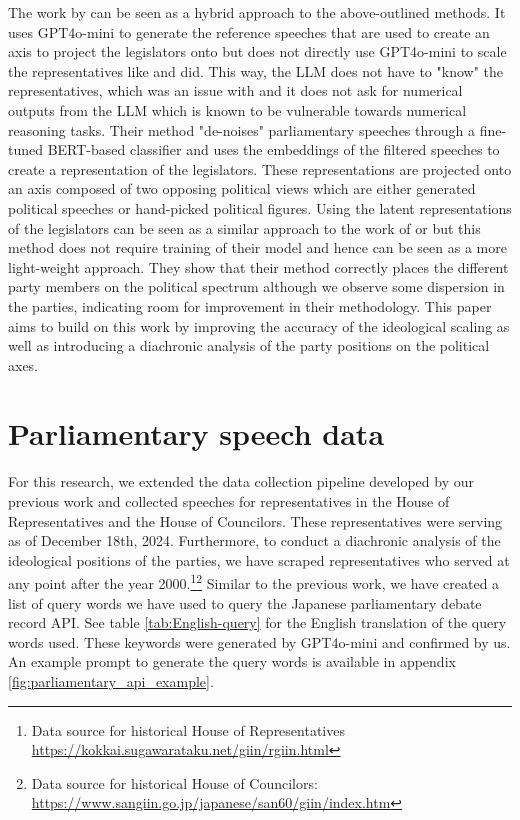 \documentclass[final,5p,times,twocolumn,authoryear]{elsarticle}
\begin{document}
The work by \citeauthor{kato2024lupinllmbasedpoliticalideology} can be seen as a hybrid approach to the above-outlined methods. It uses GPT4o-mini to generate the reference speeches that are used to create an axis to project the legislators onto but does not directly use GPT4o-mini to scale the representatives like \citeauthor{Scaling-Political-Texts-with-ChatGPT} and \citeauthor{llm-latent-position-of-politicians} did. This way, the LLM does not have to "know" the representatives, which was an issue with \citeauthor{llm-latent-position-of-politicians} and it does not ask for numerical outputs from the LLM which is known to be vulnerable towards numerical reasoning tasks. Their method "de-noises" parliamentary speeches through a fine-tuned BERT-based classifier and uses the embeddings of the filtered speeches to create a representation of the legislators. These representations are projected onto an axis composed of two opposing political views which are either generated political speeches or hand-picked political figures. Using the latent representations of the legislators can be seen as a similar approach to the work of \citeauthor{Debating-Evil:-Using-Word-Embeddings-to-Analyze-Parliamentary-Debates} or \citeauthor{Word-embeddings-for-analysis-of-ideological-placement} but this method does not require training of their model and hence can be seen as a more light-weight approach. They show that their method correctly places the different party members on the political spectrum although we observe some dispersion in the parties, indicating room for improvement in their methodology. This paper aims to build on this work by improving the accuracy of the ideological scaling as well as introducing a diachronic analysis of the party positions on the political axes.

\section{Parliamentary speech data}
\label{section:parliamentary speech data}


For this research, we extended the data collection pipeline developed by our previous work\citep{kato2024lupinllmbasedpoliticalideology} and collected speeches for representatives in the House of Representatives and the House of Councilors. These representatives were serving as of December 18th, 2024. Furthermore, to conduct a diachronic analysis of the ideological positions of the parties, we have scraped representatives who served at any point after the year 2000.\footnote{Data source for historical House of Representatives \url{https://kokkai.sugawarataku.net/giin/rgiin.html}}\footnote{Data source for historical House of Councilors: \url{https://www.sangiin.go.jp/japanese/san60/giin/index.htm}} Similar to the previous work, we have created a list of query words we have used to query the Japanese parliamentary debate record API\citep{kokkai_diet_api}. See table \ref{tab:English-query} for the English translation of the query words used. These keywords were generated by GPT4o-mini and confirmed by us. An example prompt to generate the query words is available in appendix \ref{fig:parliamentary_api_example}. 
\end{document}
